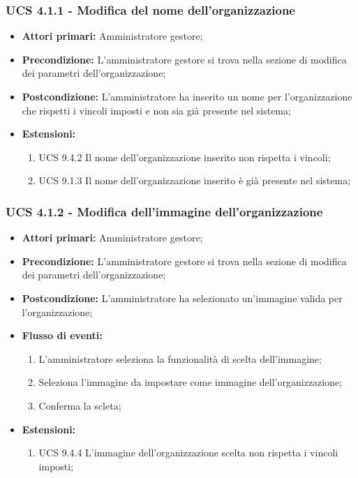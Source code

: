 \subsubsection{UCS 4.1.1 - Modifica del nome dell'organizzazione}%
\begin{itemize}
\item \textbf{Attori primari:} Amministratore gestore;
\item \textbf{Precondizione:} L'amministratore gestore si trova nella sezione di modifica dei parametri dell'organizzazione;
\item \textbf{Postcondizione:} L'amministratore ha inserito un nome per l'organizzazione che rispetti i vincoli imposti e non sia già presente nel sistema;
\item \textbf{Estensioni:}
\begin{enumerate}
    \item UCS 9.4.2 Il nome dell'organizzazione inserito non rispetta i vincoli;
    \item UCS 9.1.3 Il nome dell'organizzazione inserito è già presente nel sistema;
\end{enumerate}
\end{itemize}

\subsubsection{UCS 4.1.2 - Modifica dell'immagine dell'organizzazione}%
\begin{itemize}
\item \textbf{Attori primari:} Amministratore gestore;
\item \textbf{Precondizione:} L'amministratore gestore si trova nella sezione di modifica dei parametri dell'organizzazione;
\item \textbf{Postcondizione:} L'amministratore ha selezionato un'immagine valida per l'organizzazione;
\item \textbf{Flusso di eventi:}
\begin{enumerate}
    \item L'amministratore seleziona la funzionalità di scelta dell'immagine;
    \item Seleziona l'immagine da impostare come immagine dell'organizzazione;
    \item Conferma la scleta;
\end{enumerate}
\item \textbf{Estensioni:}
\begin{enumerate}
    \item UCS 9.4.4 L'immagine dell'organizzazione scelta non rispetta i vincoli imposti;
\end{enumerate}
\end{itemize}

